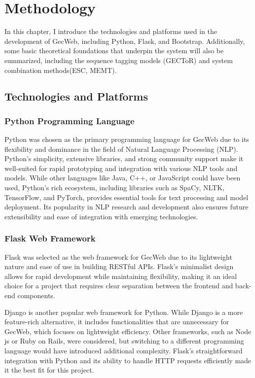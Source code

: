 \chapter{Methodology}
\label{chapter:methodology}

In this chapter, I introduce the technologies and platforms used in the development of GecWeb, including Python, Flask, and Bootstrap.
Additionally, some basic theoretical foundations that underpin the system will also be summarized, including the sequence tagging models (GECToR) and system combination methods(ESC, MEMT).

\section{Technologies and Platforms}
\label{technologies-and-platforms}

\subsection{Python Programming Language}
\label{python-programming-language}

Python was chosen as the primary programming language for GecWeb due to its flexibility and dominance in the field of Natural Language Processing (NLP).
Python's simplicity, extensive libraries, and strong community support make it well-suited for rapid prototyping and integration with various NLP tools and models.
While other languages like Java, C++, or JavaScript could have been used, Python's rich ecosystem, including libraries such as SpaCy, NLTK, TensorFlow, and PyTorch, provides essential tools for text processing and model deployment.
Its popularity in NLP research and development also ensures future extensibility and ease of integration with emerging technologies.

\subsection{Flask Web Framework}
\label{flask-web-framework}

Flask was selected as the web framework for GecWeb due to its lightweight nature and ease of use in building RESTful APIs.
Flask's minimalist design allows for rapid development while maintaining flexibility, making it an ideal choice for a project that requires clear separation between the frontend and back-end components.

Django is another popular web framework for Python.
While Django is a more feature-rich alternative, it includes functionalities that are unnecessary for GecWeb, which focuses on lightweight efficiency.
Other frameworks, such as Node js or Ruby on Rails, were considered, but switching to a different programming language would have introduced additional complexity.
Flask's straightforward integration with Python and its ability to handle HTTP requests efficiently made it the best fit for this project.

